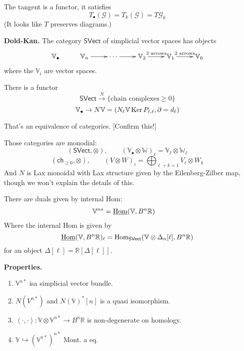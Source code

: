 \medskip\noindent
The tangent is a functor, it satisfies
$$
T_\bullet(\mathcal{G})=T_k(\mathcal{G})=T\mathcal{G}_k
$$
(It looks like $T$ preserves diagrams.)

\medskip\noindent
{\bf Dold-Kan.} The category $\mathsf{SVect}$ of simplicial vector spaces
has objects
$$
\xymatrix{
\mathbb{V}_\bullet&  \mathbb{V}_n\ar[r]&\cdots
\ar[r]&\mathbb{V}_2\ar[r]^{\text{3 arrows}}&
\mathbb{V}_1\ar[r]^{\text{2 arrows}}&\mathbb{V}_0
}
$$
where the $\mathbb{V}_i$ are vector spaces.

There is a functor
$$
\mathsf{SVect}\overset{N}{\to}\{\text{chain complexes}\geq 0\}
$$
$$
\mathbb{V}_{\bullet}\to N\mathbb{V}=
\left(N_\ell \mathbb{V}\mathop{\mathrm{Ker}} P_{\ell,\ell},\partial=d_\ell\right)
$$

\begin{theorem}
\label{theorem-Dold-Kan}
That's an equivalence of categories. [Confirm this!]
\end{theorem}

Those categories are monodial:
$$
(\mathsf{SVect},\otimes),\qquad  (\mathbb{V}_\bullet \otimes \mathbb{W})_\ell
=\mathbb{V}_\ell \otimes \mathbb{W}_\ell
$$
$$
(\mathsf{ch}_{\geq 0},\otimes),\qquad (V \otimes W)_i=
\bigoplus_{\ell +k=1}V_\ell \otimes W_k
$$
And $N$ is Lax monoidal with Lax structure given by the
Eilenberg-Zilber map, though we won't explain the details of this.

There are duals given by internal Hom:
\begin{align*}
\mathbb{V}^{n*}&=\underline{\mathop{\mathrm{Hom}}\nolimits}(\mathbb{V},B^n\mathbb{R})
\end{align*}
Where the internal Hom is given by
$$
\underline{\mathop{\mathrm{Hom}}\nolimits}(\mathbb{V},B^n\mathbb{R})_\ell
=\mathop{\mathrm{Hom}}\nolimits_{\mathsf{SVect}}(\mathbb{V}\otimes\Delta_n[\ell],B^n\mathbb{R})
$$
for an object $\Delta[\ell]=\mathbb{R}[\Delta[\ell]]$.


\medskip\noindent
{\bf Properties.}
\begin{enumerate}
\item $\mathbb{V}^{n*}$ isa simplicial vector bundle.
\item $N(V^{n*})$ and $N(\mathbb{V})^*[n]$ is a quasi isomorphism.
\item $\left<\cdot,\cdot\right>:\mathbb{V}\otimes \mathbb{V}^{n*}\to
B^n\mathbb{R}$ is non-degenerate on homology.
\item $\mathbb{V}\hookrightarrow (\mathbb{V}^{n*})^{n*}$ 
Mont. a eq.
\end{enumerate}

